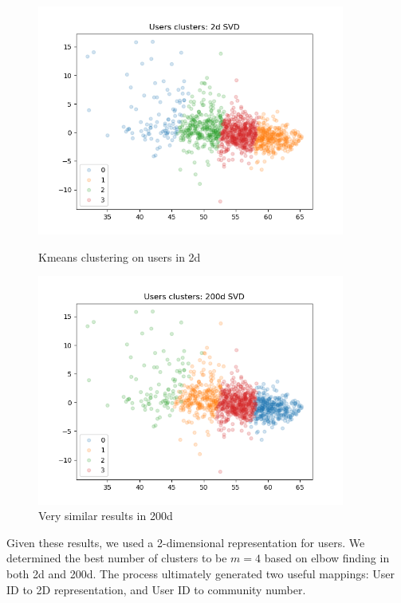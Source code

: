 \documentclass[11pt]{article}
\begin{document}
\begin{figure}[h!]
    \centering
    \begin{minipage}{0.45\textwidth}
        \centering
        \includegraphics[width=0.9\textwidth]{user_clusters_2d} %
        \caption{Kmeans clustering on users in 2d}
    \end{minipage}\hfill
    \begin{minipage}{0.45\textwidth}
        \centering
        \includegraphics[width=0.9\textwidth]{user_clusters_200d} %
        \caption{Very similar results in 200d}
    \end{minipage}
\end{figure}

Given these results, we used a 2-dimensional representation for users. We determined the best number of clusters to be $m = 4$ based on elbow finding in both 2d and 200d. The process ultimately generated two useful mappings: User ID to 2D representation, and User ID to community number.
\end{document}
